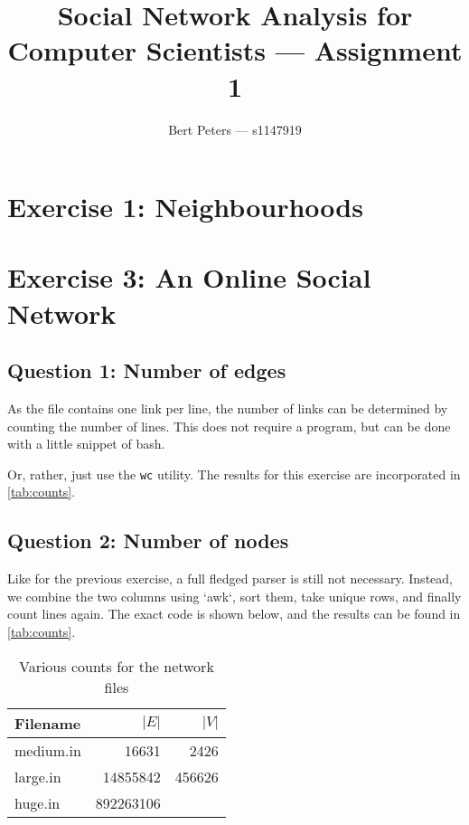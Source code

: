 \documentclass[12pt,a4paper,hidelinks]{article}
\author{Bert Peters --- s1147919}
\title{Social Network Analysis for Computer Scientists --- Assignment 1}
\begin{document}
\maketitle

\section{Exercise 1: Neighbourhoods}

\section{Exercise 3: An Online Social Network}

\subsection{Question 1: Number of edges}

As the file contains one link per line, the number of links can be determined by counting the number of lines. This does not require a program, but can be done with a little snippet of bash.



Or, rather, just use the \texttt{wc} utility. The results for this exercise are incorporated in \autoref{tab:counts}.

\subsection{Question 2: Number of nodes}

Like for the previous exercise, a full fledged parser is still not necessary. Instead, we combine the two columns using `awk`, sort them, take unique rows, and finally count lines again. The exact code is shown below, and the results can be found in \autoref{tab:counts}.



\begin{table}
\centering
\begin{tabular}{l | r | r}
Filename & {\centering $|E|$} & $|V|$ \\
\hline
medium.in & 16631 & 2426 \\
large.in & 14855842 & 456626 \\
huge.in & 892263106 &
\end{tabular}

\caption{Various counts for the network files}
\label{tab:counts}
\end{table}
\end{document}
